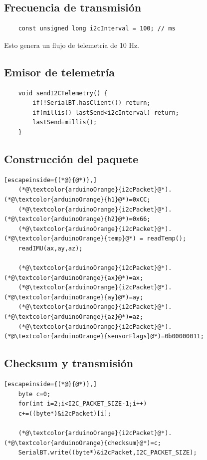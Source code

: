 \documentclass[12pt,a4paper]{article}
\begin{document}
\subsection{Frecuencia de transmisión}

\begin{lstlisting}
	const unsigned long i2cInterval = 100; // ms
\end{lstlisting}

Esto genera un flujo de telemetría de 10 Hz.

\subsection{Emisor de telemetría}

\begin{lstlisting}
	void sendI2CTelemetry() {
		if(!SerialBT.hasClient()) return;
		if(millis()-lastSend<i2cInterval) return;
		lastSend=millis();
	}
\end{lstlisting}

\subsection{Construcción del paquete}

\begin{lstlisting}[escapeinside={(*@}{@*)},]
	(*@\textcolor{arduinoOrange}{i2cPacket}@*).(*@\textcolor{arduinoOrange}{h1}@*)=0xCC;
	(*@\textcolor{arduinoOrange}{i2cPacket}@*).(*@\textcolor{arduinoOrange}{h2}@*)=0x66;
	(*@\textcolor{arduinoOrange}{i2cPacket}@*).(*@\textcolor{arduinoOrange}{temp}@*) = readTemp();
	readIMU(ax,ay,az);
	
	(*@\textcolor{arduinoOrange}{i2cPacket}@*).(*@\textcolor{arduinoOrange}{ax}@*)=ax;
	(*@\textcolor{arduinoOrange}{i2cPacket}@*).(*@\textcolor{arduinoOrange}{ay}@*)=ay;
	(*@\textcolor{arduinoOrange}{i2cPacket}@*).(*@\textcolor{arduinoOrange}{az}@*)=az;
	(*@\textcolor{arduinoOrange}{i2cPacket}@*).(*@\textcolor{arduinoOrange}{sensorFlags}@*)=0b00000011;
\end{lstlisting}

\subsection{Checksum y transmisión}

\begin{lstlisting}[escapeinside={(*@}{@*)},]
	byte c=0;
	for(int i=2;i<I2C_PACKET_SIZE-1;i++)
	c+=((byte*)&i2cPacket)[i];
	
	(*@\textcolor{arduinoOrange}{i2cPacket}@*).(*@\textcolor{arduinoOrange}{checksum}@*)=c;
	SerialBT.write((byte*)&i2cPacket,I2C_PACKET_SIZE);
\end{lstlisting}
\end{document}
